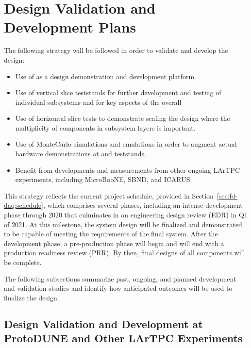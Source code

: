 \section{Design Validation and Development Plans}
\label{sec:fd-daq:validation}

The following strategy will be followed in order to validate and
develop the    design:
\begin{itemize}
\item Use of  as a design demonstration and
  development platform. 
\item Use of vertical slice teststands for further development and testing of
  individual  subsystems and for key aspects of the
  overall 
\item Use of horizontal slice tests to demonstrate scaling the design
  where the multiplicity of components in subsystem layers is important.
\item Use of  MonteCarlo simulations and emulations in order
  to augment actual hardware demonstrations at  and teststands.
\item Benefit from developments and measurements from other ongoing
  LArTPC experiments, including MicroBooNE, SBND, and ICARUS.
\end{itemize}

This strategy reflects the current  project schedule,
provided in Section~\ref{sec:fd-daq:schedule}, which
comprises several phases, including an intense development phase
through 2020 that culminates in an engineering design
review (EDR) in Q1 of 2021. At this milestone, the system design will be
finalized and demonstrated to be capable of meeting the requirements of the
final  system. After the development phase, a
pre-production phase will begin and will end with a production readiness
review (PRR). By then, final designs of all components
will be complete.

The following subsections summarize past, ongoing, and planned
development and validation studies and identify how anticipated outcomes
will be used to finalize the  design.

\subsection{Design Validation and Development at ProtoDUNE and Other
  LArTPC Experiments}

\label{sec:fd-daq:protodune}

